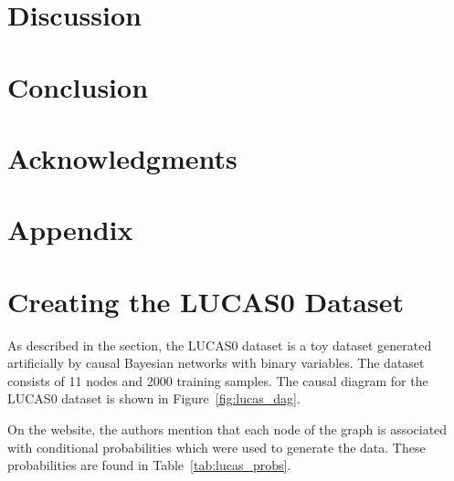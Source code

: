 \documentclass{article}
\begin{document}
\section{Discussion}


\section{Conclusion}


\section*{Acknowledgments}



\newpage


\newpage

\section*{Appendix}

\appendix
\section{Creating the LUCAS0 Dataset}
\label{create}

As described in the  section, the LUCAS0 dataset is a toy dataset generated 
artificially by causal Bayesian networks with binary variables. The dataset consists of 
11 nodes and 2000 training samples. The causal diagram for the LUCAS0 dataset is shown in Figure~\ref{fig:lucas_dag}.

On the website, the authors mention that each node of the graph is associated with conditional probabilities
which were used to generate the data. These probabilities are found in Table~\ref{tab:lucas_probs}.
\end{document}
